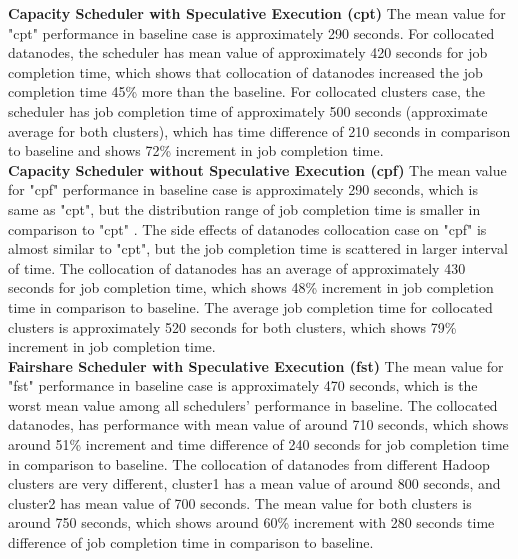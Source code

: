 \textbf{Capacity Scheduler with Speculative Execution (cpt)} The mean value for "cpt" performance in baseline case is approximately 290 seconds. For collocated datanodes, the scheduler has mean value of approximately 420 seconds for job completion time, which shows that collocation of datanodes increased the job completion time 45\% more than the baseline. For collocated clusters case, the scheduler has job completion time of approximately 500 seconds (approximate average for both clusters), which has time difference of 210 seconds in comparison to baseline and shows 72\% increment in job completion time.\\

\textbf{Capacity Scheduler without Speculative Execution (cpf)} The mean value for "cpf" performance  in baseline case is approximately 290 seconds, which is same as "cpt", but the distribution range of job completion time is smaller in comparison to "cpt" . The side effects of datanodes collocation case on "cpf" is almost similar to "cpt", but the job completion time is scattered in larger interval of time. The collocation of datanodes has an average of approximately 430 seconds for job completion time, which shows 48\% increment in job completion time in comparison to baseline. The average job completion time for collocated clusters is approximately 520 seconds for both clusters, which shows 79\% increment in job completion time. \\ 


\textbf{Fairshare Scheduler with Speculative Execution (fst)} The mean value for "fst" performance in  baseline case is approximately 470 seconds, which is the worst mean value among all schedulers' performance in baseline. The collocated datanodes, has performance with mean value of around 710 seconds, which shows around 51\% increment and time difference of 240 seconds for job completion time in comparison to baseline. The collocation of datanodes from different Hadoop clusters are very different, cluster1 has a mean value of around 800 seconds, and cluster2 has mean value of 700 seconds. The mean value for both clusters is around 750 seconds,  which shows around 60\% increment with 280 seconds time difference of job completion time in comparison to baseline.\\

